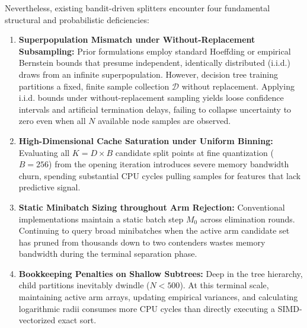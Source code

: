 Nevertheless, existing bandit-driven splitters encounter four fundamental structural and probabilistic deficiencies:
\begin{enumerate}
    \item \textbf{Superpopulation Mismatch under Without-Replacement Subsampling:} Prior formulations employ standard Hoeffding or empirical Bernstein bounds that presume independent, identically distributed (i.i.d.) draws from an infinite superpopulation. However, decision tree training partitions a fixed, finite sample collection $\mathcal{D}$ without replacement. Applying i.i.d. bounds under without-replacement sampling yields loose confidence intervals and artificial termination delays, failing to collapse uncertainty to zero even when all $N$ available node samples are observed.
    \item \textbf{High-Dimensional Cache Saturation under Uniform Binning:} Evaluating all $K = D \times B$ candidate split points at fine quantization ($B = 256$) from the opening iteration introduces severe memory bandwidth churn, spending substantial CPU cycles pulling samples for features that lack predictive signal.
    \item \textbf{Static Minibatch Sizing throughout Arm Rejection:} Conventional implementations maintain a static batch step $M_0$ across elimination rounds. Continuing to query broad minibatches when the active arm candidate set has pruned from thousands down to two contenders wastes memory bandwidth during the terminal separation phase.
    \item \textbf{Bookkeeping Penalties on Shallow Subtrees:} Deep in the tree hierarchy, child partitions inevitably dwindle ($N < 500$). At this terminal scale, maintaining active arm arrays, updating empirical variances, and calculating logarithmic radii consumes more CPU cycles than directly executing a SIMD-vectorized exact sort.
\end{enumerate}

